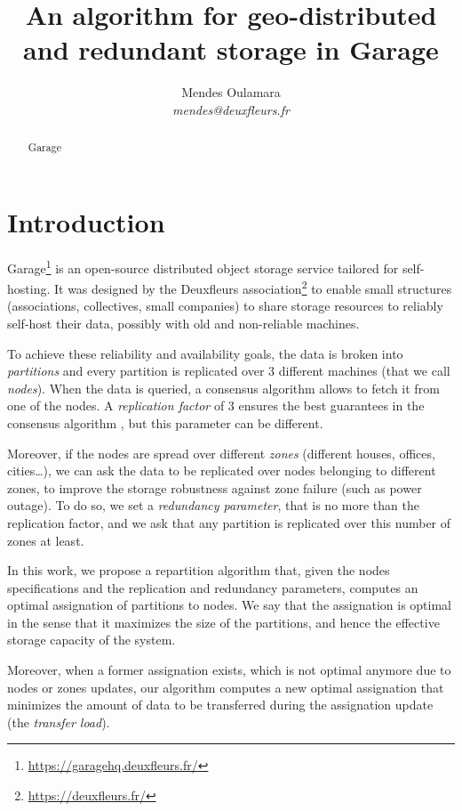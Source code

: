 \documentclass[]{article}
\title{An algorithm for geo-distributed and redundant storage in Garage}
\author{Mendes Oulamara \\ \emph{mendes@deuxfleurs.fr}}
\date{}
\begin{document}
\maketitle

\begin{abstract}
	Garage
\end{abstract}

\section{Introduction}

Garage\footnote{\url{https://garagehq.deuxfleurs.fr/}} is an open-source distributed object storage service tailored for self-hosting. It was designed by the Deuxfleurs association\footnote{\url{https://deuxfleurs.fr/}} to enable small structures (associations, collectives, small companies) to share storage resources to reliably self-host their data, possibly with old and non-reliable machines.

To achieve these reliability and availability goals, the data is broken into \emph{partitions} and every partition is replicated over 3 different machines (that we call \emph{nodes}). When the data is queried, a consensus algorithm allows to fetch it from one of the nodes. A \emph{replication factor} of 3 ensures the best guarantees in the consensus algorithm \cite{ADD RREF}, but this parameter can be different.

Moreover, if the nodes are spread over different \emph{zones} (different houses, offices, cities\dots), we can ask the data to be replicated over nodes belonging to different zones, to improve the storage robustness against zone failure (such as power outage). To do so, we set a \emph{redundancy parameter}, that is no more than the replication factor, and we ask that any partition is replicated over this number of zones at least.

In this work, we propose a repartition algorithm that, given the nodes specifications and the replication and redundancy parameters, computes an optimal assignation of partitions to nodes. We say that the assignation is optimal in the sense that it maximizes the size of the partitions, and hence the effective storage capacity of the system.

Moreover, when a former assignation exists, which is not optimal anymore due to nodes or zones updates, our algorithm computes a new optimal assignation that minimizes the amount of data to be transferred during the assignation update (the \emph{transfer load}).
\end{document}
